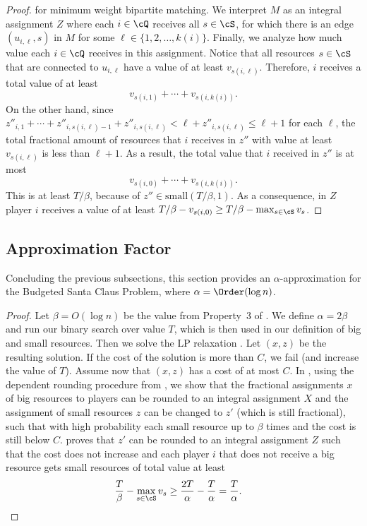 \documentclass[a4paper,USenglish,cleveref,thm-restate]{lipics-v2021}
\begin{document}
\begin{proof}
    for minimum weight bipartite matching.
    We interpret $M$ as an integral assignment $Z$
    where each $i\in \cQ$ receives all $s\in \cS$,
    for which there is an edge $(u_{i,\ell}, s)$ in $M$
    for some $\ell\in\{1,2,\dotsc,k(i)\}$.
    Finally, we analyze how much value each $i\in\cQ$
    receives in this assignment.
    Notice that all resources $s\in\cS$
    that are connected to $u_{i,\ell}$ have a value
    of at least $v_{s(i,\ell)}$.
    Therefore, $i$ receives a total value of at least
    \begin{equation*}
        v_{s(i,1)} + \cdots + v_{s(i,k(i))} .
    \end{equation*}
    On the other hand, 
    since $z''_{i,1} + \cdots + z''_{i,s(i, \ell ) - 1} + z''_{i,s(i, \ell)} < \ell + z''_{i,s(i, \ell)} \le \ell + 1$ for each $\ell$,
    the total fractional amount of resources that $i$ receives in $z''$
    with value at least $v_{s(i, \ell)}$ is less than $\ell + 1$.
    As a result, the total value that $i$ received in $z''$
    is at most
    \begin{equation*}
        v_{s(i,0)} + \cdots + v_{s(i,k(i))} .
    \end{equation*}
    This is at least $T/\beta$, because of $z''\in\mathrm{small}(T/\beta,1)$.
    As a consequence, in $Z$ player $i$ receives a value of at least
    $T/\beta - v_{s(i,0)} \ge T/\beta - \max_{s\in\cS} v_s$.
\end{proof}


\subsection{Approximation Factor}
Concluding the previous subsections, this section provides an $\alpha$-approximation for the Budgeted Santa Claus Problem, where $\alpha = \Order(\log n)$. 
\SCapprox*
\begin{proof}
   Let $\beta = O(\log n)$ be the value from Property~3 of . We define $\alpha = 2\beta$
   and run our binary search over value $T$,
   which is then used in our definition of big and small resources.
   Then we solve the LP relaxation . 
   Let $(x,z)$ be the resulting solution. 
   If the cost of the solution is more than $C$, we fail (and
   increase the value of $T$). Assume now that $(x,z)$ has
   a cost of at most $C$.
   In , using the dependent rounding procedure from , we show that the fractional assignments $x$ of big resources to players can be rounded to an integral assignment $X$ and the assignment of small resources $z$ can be changed to $z'$ (which is still fractional), such that with high probability each small resource up to
   $\beta$ times and the cost is still below $C$. 
    proves that $z'$
   can be rounded to an integral assignment $Z$ such that
   the cost does not increase and each player $i$ that does
   not receive a big resource gets small resources of total value at least
   \begin{align*}
    \frac{T}{\beta} - \max_{s\in\cS} v_s &\geq \frac{2T}{\alpha} - \frac{T}{\alpha} = \frac{T}{\alpha}. \qedhere
    \end{align*}
\end{proof}
\end{document}
